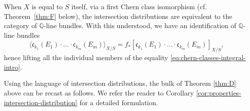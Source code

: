 \documentclass[11pt]{article}
\newcommand{\cf}{cf.\xspace}
\theoremstyle{plain}
\theoremstyle{definition}
\newcommand{\QBbb}{\mathbb Q}
\newcommand{\cfrak}{\mathfrak c}
\begin{document}
When $X$ is equal to $S$ itself, via a first Chern class isomorphism (\cf Theorem~\ref{thm:F} below), the intersection distributions are equivalent to the category of $\QBbb$-line bundles. With this understood, we have an identification of $\QBbb$-line bundles
\begin{displaymath}
\langle \cfrak_{k_1}(E_1) \cdot \ldots \cdot \cfrak_{k_m}(E_m) \rangle_{X/S} = f_\ast [ \cfrak_{k_1}(E_1) \cdot \ldots \cdot \cfrak_{k_m}(E_m) ]_{X/S},
\end{displaymath}
hence lifting all the individual members of the equality \eqref{eq:chern-classes-integral-intro}.

Using the language of intersection distributions, the bulk of Theorem \ref{thm:D} above can be recast as follows. We refer the reader to Corollary \ref{cor:properties-intersection-distribution} for a detailed formulation.
\end{document}
